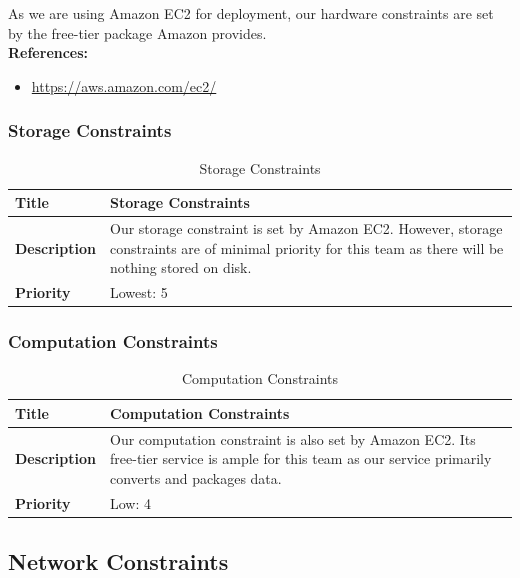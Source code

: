 \documentclass{article}
\begin{document}
As we are using Amazon EC2 for deployment, our hardware constraints are set by the free-tier package Amazon provides. \\

\textbf{References:}
\begin{itemize}
	\item \url{https://aws.amazon.com/ec2/}
\end{itemize}

\subsubsection{Storage Constraints}

\begin{table}[H]
	\caption{Storage Constraints}
	\begin{tabularx}{\textwidth}{|l|X|}
		\hline
		\textbf{Title}       & Storage Constraints                          \\ \hline
		\textbf{Description} & Our storage constraint is set by Amazon EC2.
		However, storage constraints are of minimal priority for this team
		as there will be nothing stored on disk.        \\ \hline
		\textbf{Priority}    & Lowest: 5                                    \\ \hline
	\end{tabularx}
\end{table}

\subsubsection{Computation Constraints}

\begin{table}[H]
	\caption{Computation Constraints}
	\begin{tabularx}{\textwidth}{|l|X|}
		\hline
		\textbf{Title}       & Computation Constraints                          \\ \hline
		\textbf{Description} & Our computation constraint is also set by Amazon
		EC2. Its free-tier service is ample for this team as our service
		primarily converts and packages data.          \\ \hline
		\textbf{Priority}    & Low: 4                                           \\ \hline
	\end{tabularx}
\end{table}

\subsection{Network Constraints}
\end{document}
